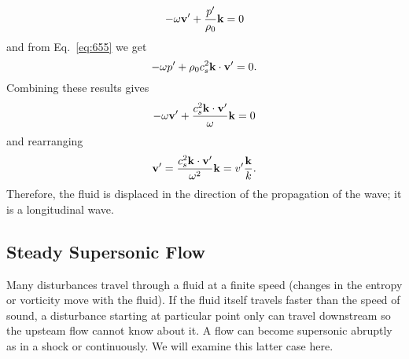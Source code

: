 \begin{equation}
- \omega {\bf v}' +  \frac{p'}{\rho_0} {\bf k} = 0
\label{eq:660}
\end{equation}
and from Eq.~\ref{eq:655} we get
\begin{equation}
- \omega p' +  \rho_0 c_s^2 {\bf k} \cdot {\bf v'} = 0.
\label{eq:661}
\end{equation}
Combining these results gives
\begin{equation}
- \omega {\bf v}' +  \frac{c_s^2 {\bf k} \cdot {\bf
    v'}}{\omega} {\bf k} =0
\label{eq:662}
\end{equation}
and rearranging
\begin{equation}
{\bf v}' = \frac{c_s^2 {\bf k} \cdot {\bf v'}}{\omega^2} {\bf
  k} = v' \frac{\bf k}{k}.
\label{eq:663}
\end{equation}
Therefore, the fluid is displaced in the direction of the propagation
of the wave; it is a longitudinal wave.

\subsection{Steady Supersonic Flow}
\label{sec:steady-supers-flow}
Many disturbances travel through a fluid at a finite speed (changes in
the entropy or vorticity move with the fluid).  If the fluid itself
travels faster than the speed of sound, a disturbance starting at
particular point only can travel downstream so the upsteam flow cannot
know about it.  A flow can become supersonic abruptly as in a
shock or continuously.  We will examine this latter case here.

